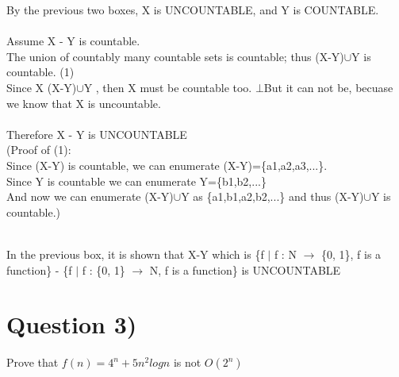 \documentclass[a4paper,12pt]{article}
\begin{document}
\begin{tcolorbox}
By the previous two boxes, X is UNCOUNTABLE, and Y is COUNTABLE.\\\\
Assume X - Y is countable.\\
The union of countably many countable sets is countable; thus (X-Y)$\cup$Y is countable. (1)\\
Since X \subset (X-Y)$\cup$Y , then X must be countable too.
$\bot$But it can not be, becuase we know that X is uncountable.\\\\

Therefore  X - Y is UNCOUNTABLE\\

(Proof of (1): \\
Since (X-Y) is countable, we can enumerate (X-Y)=\{a1,a2,a3,...\}.\\
Since Y is countable we can enumerate Y=\{b1,b2,...\}\\
And now we can enumerate (X-Y)$\cup$Y as \{a1,b1,a2,b2,...\} and thus 
(X-Y)$\cup$Y is countable.) \\ \\



\end{tcolorbox}

In the previous box, it is shown that X-Y which is  \{f $|$ f : N $\rightarrow$ \{0, 1\}, f is a function\} - \{f $|$ f : \{0, 1\} $\rightarrow$ N, f is a function\} is UNCOUNTABLE

\newpage
\section*{Question 3)\hfill {}}
Prove that $f(n) = 4^n +5n^2 logn $ is not $O(2^n)$
\end{document}
